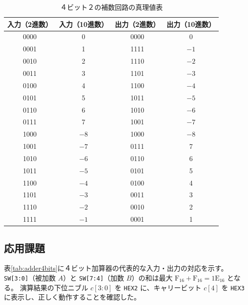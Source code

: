\documentclass[12pt,a4paper]{ltjsarticle}
\begin{document}
\begin{table}[H]
  \centering
  \caption{４ビット２の補数回路の真理値表}
  \label{tab:twocomplement}
  \begin{tabular}{cc|cc}
    \toprule
     入力（2進数） & 入力（10進数） & 出力（2進数） & 出力（10進数） \\
    \midrule
    0000 &  0 & 0000 &  0 \\
    0001 &  1 & 1111 & $-1$ \\
    0010 &  2 & 1110 & $-2$ \\
    0011 &  3 & 1101 & $-3$ \\
    0100 &  4 & 1100 & $-4$ \\
    0101 &  5 & 1011 & $-5$ \\
    0110 &  6 & 1010 & $-6$ \\
    0111 &  7 & 1001 & $-7$ \\
    1000 & $-8$ & 1000 & $-8$ \\
    1001 & $-7$ & 0111 &  7 \\
    1010 & $-6$ & 0110 &  6 \\
    1011 & $-5$ & 0101 &  5 \\
    1100 & $-4$ & 0100 &  4 \\
    1101 & $-3$ & 0011 &  3 \\
    1110 & $-2$ & 0010 &  2 \\
    1111 & $-1$ & 0001 &  1 \\
    \bottomrule
  \end{tabular}
\end{table}

\newpage
\subsection{応用課題}

表\ref{tab:adder4bits}に４ビット加算器の代表的な入力・出力の対応を示す。
\texttt{SW[3:0]}（被加数 $A$）と \texttt{SW[7:4]}（加数 $B$）の和は最大
$\mathrm{F}_{16}+\mathrm{F}_{16}=\mathrm{1E}_{16}$ となる。
演算結果の下位ニブル $c[3:0]$ を \texttt{HEX2} に、キャリービット $c[4]$ を
\texttt{HEX3} に表示し、正しく動作することを確認した。
\end{document}
